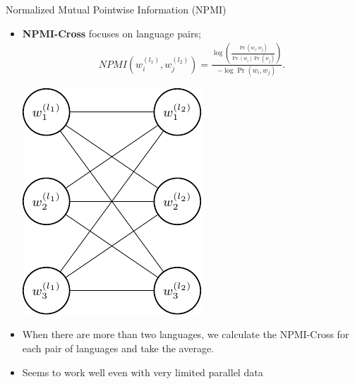 \documentclass[compress]{beamer}
\begin{document}
		\begin{frame}{Normalized Mutual Pointwise Information (NPMI)}
			\begin{itemize}
				\item \textbf{NPMI-Cross} focuses on language pairs;
				\begin{align}
				NPMI\left(w_i^{(l_1)},w_j^{(l_2)}\right)=\frac{\log\left(\frac{\Pr(w_i,w_j)}{\Pr(w_i)\Pr(w_j)}\right)}{-\log\Pr(w_i,w_j)}.
				\end{align}
			\begin{center}
				\includegraphics[height=0.3\textheight]{multilingual_itm/npmi-cross.pdf}
			\end{center}

				\item When there are more than two languages, we calculate the NPMI-Cross for each pair of languages and take the average.			
				\item Seems to work well even with
                                  very limited parallel data
			\end{itemize}
		\end{frame}
		
\end{document}
